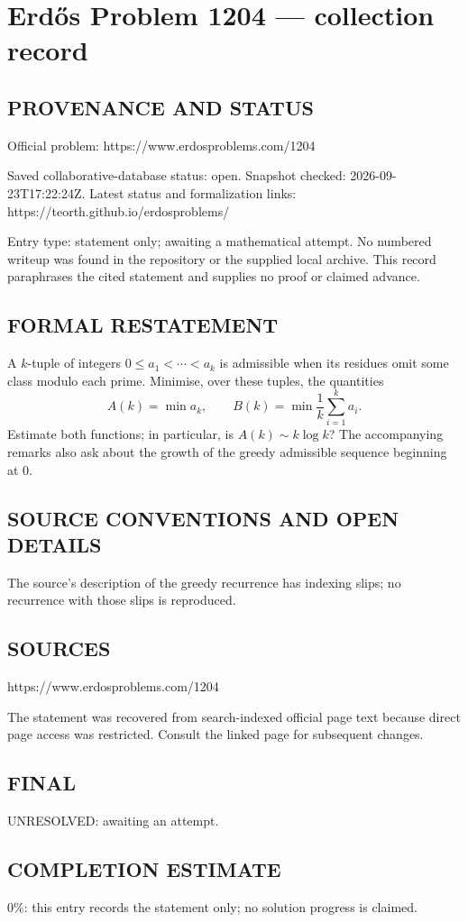 \section*{Erd\H{o}s Problem 1204 --- collection record}

\subsection*{PROVENANCE AND STATUS}
Official problem: https://www.erdosproblems.com/1204

Saved collaborative-database status: open.
Snapshot checked: 2026-09-23T17:22:24Z.
Latest status and formalization links: https://teorth.github.io/erdosproblems/

Entry type: statement only; awaiting a mathematical attempt. No numbered writeup was found in the repository or the supplied local archive. This record paraphrases the cited statement and supplies no proof or claimed advance.

\subsection*{FORMAL RESTATEMENT}
A $k$-tuple of integers $0\leq a_1<\cdots<a_k$ is admissible when its residues omit some class modulo each prime. Minimise, over these tuples, the quantities
\[A(k)=\min a_k,\qquad B(k)=\min\frac1k\sum_{i=1}^k a_i.\]
Estimate both functions; in particular, is $A(k)\sim k\log k$? The accompanying remarks also ask about the growth of the greedy admissible sequence beginning at $0$.

\subsection*{SOURCE CONVENTIONS AND OPEN DETAILS}
The source's description of the greedy recurrence has indexing slips; no recurrence with those slips is reproduced.

\subsection*{SOURCES}
https://www.erdosproblems.com/1204

The statement was recovered from search-indexed official page text because direct page access was restricted. Consult the linked page for subsequent changes.

\subsection*{FINAL}
UNRESOLVED: awaiting an attempt.

\subsection*{COMPLETION ESTIMATE}
$0\%$: this entry records the statement only; no solution progress is claimed.
